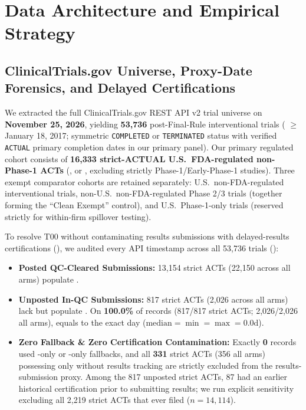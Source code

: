 \documentclass[11pt,letterpaper]{article}
\begin{document}
\section{Data Architecture and Empirical Strategy}

\subsection{ClinicalTrials.gov Universe, Proxy-Date Forensics, and Delayed Certifications}
We extracted the full ClinicalTrials.gov REST API v2 trial universe on \textbf{November 25, 2026}, yielding \textbf{53,736} post-Final-Rule interventional trials ( $\ge$ January 18, 2017; symmetric \texttt{COMPLETED} or \texttt{TERMINATED} status with verified \texttt{ACTUAL} primary completion dates in our primary panel). Our primary regulated cohort consists of \textbf{16,333 strict-ACTUAL U.S.\ FDA-regulated non-Phase-1 ACTs} (,  or , excluding strictly Phase-1/Early-Phase-1 studies). Three exempt comparator cohorts are retained separately: U.S.\ non-FDA-regulated interventional trials, non-U.S.\ non-FDA-regulated Phase 2/3 trials (together forming the ``Clean Exempt'' control), and U.S.\ Phase-1-only trials (reserved strictly for within-firm spillover testing).

To resolve T00 without contaminating results submissions with delayed-results certifications (), we audited every API timestamp across all 53,736 trials ():
\begin{itemize}
    \item \textbf{Posted QC-Cleared Submissions:} 13,154 strict ACTs (22,150 across all arms) populate .
    \item \textbf{Unposted In-QC Submissions:} 817 strict ACTs (2,026 across all arms) lack  but populate . On \textbf{100.0\%} of records (817/817 strict ACTs; 2,026/2,026 all arms),  equals  to the exact day ($\text{median}=\min=\max=0.0\text{d}$).
    \item \textbf{Zero Fallback \& Zero Certification Contamination:} Exactly \textbf{0} records used -only or -only fallbacks, and all \textbf{331} strict ACTs (356 all arms) possessing only  without results tracking are strictly excluded from the results-submission proxy. Among the 817 unposted strict ACTs, 87 had an earlier historical certification prior to submitting results; we run explicit sensitivity excluding all 2,219 strict ACTs that ever filed  ($n=14,114$).
\end{itemize}
\end{document}
